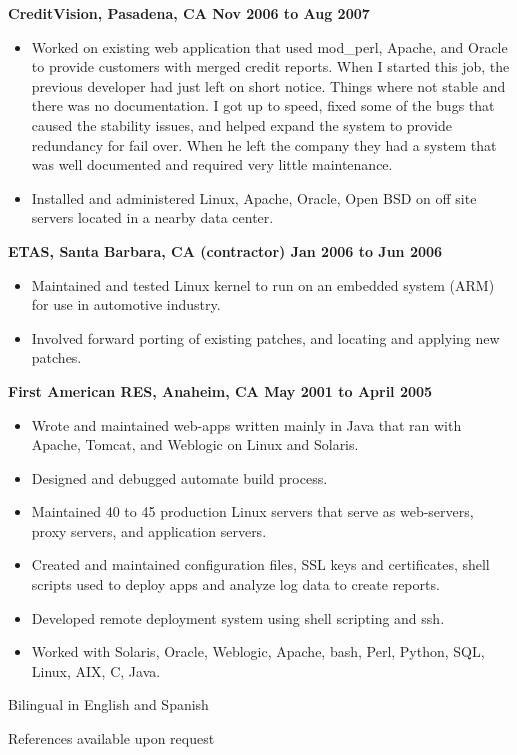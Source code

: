 \documentclass{res}
\begin{document}
\begin{resume}
{\large \bf CreditVision, Pasadena, CA \hfill Nov 2006 to Aug 2007}

\begin{itemize}

\item
	Worked on existing web application that used mod\_perl, Apache,
	and Oracle to provide customers with merged credit reports.
	When I started this job, the previous developer had just
	left on short notice.  Things where not stable and there was
	no documentation.  I got up to speed, fixed some of the bugs
	that caused the stability issues, and helped expand the system
	to provide redundancy for fail over.  When he left the company
	they had a system that was well documented and required very
	little maintenance.

\item
	Installed and administered Linux, Apache, Oracle, Open BSD on
	off site servers located in a nearby data center.
\end{itemize}

{\large \bf ETAS, Santa Barbara, CA (contractor) \hfill Jan 2006 to
Jun 2006}

\begin{itemize}

\item
	Maintained and tested Linux kernel to run on an embedded system
	(ARM) for use in automotive industry.

\item
	Involved forward porting of existing patches, and locating and
	applying new patches.

\end{itemize}


{\large \bf First American RES, Anaheim, CA \hfill May 2001 to April 2005}

\begin{itemize}

\item
	Wrote and maintained web-apps written mainly in Java that ran
	with Apache, Tomcat, and Weblogic on Linux and Solaris.
\item
	Designed and debugged automate build process.
\item
	Maintained 40 to 45 production Linux servers that serve as
	web-servers, proxy servers, and application servers.
\item
	Created and maintained configuration files, SSL keys and
	certificates, shell scripts used to deploy apps and analyze log
	data to create reports.

\item
	Developed remote deployment system using shell scripting and ssh.

\item
	Worked with Solaris, Oracle, Weblogic, Apache, bash, Perl,
	Python, SQL, Linux, AIX, C, Java.

\end{itemize}

Bilingual in English and Spanish

References available upon request

\end{resume}
\end{document}
